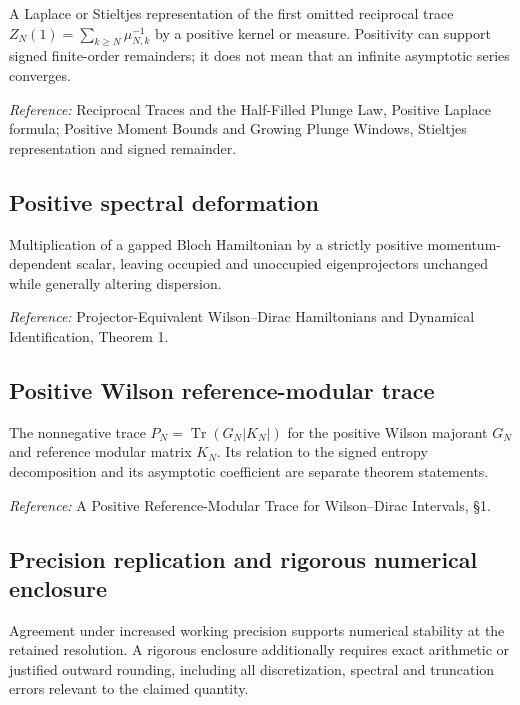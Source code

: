 \documentclass[
  10pt,
  a4paper,
]{article}
\begin{document}
A Laplace or Stieltjes representation of the first omitted reciprocal trace \(Z_N(1)=\sum_{k\ge N}\mu_{N,k}^{-1}\) by a positive kernel or measure. Positivity can support signed finite-order remainders; it does not mean that an infinite asymptotic series converges.

\nopagebreak[4]

\emph{Reference:} Reciprocal Traces and the Half-Filled Plunge Law, Positive Laplace formula; Positive Moment Bounds and Growing Plunge Windows, Stieltjes representation and signed remainder.

\subsection{Positive spectral deformation}\label{positive-spectral-deformation}

Multiplication of a gapped Bloch Hamiltonian by a strictly positive momentum-dependent scalar, leaving occupied and unoccupied eigenprojectors unchanged while generally altering dispersion.

\nopagebreak[4]

\emph{Reference:} Projector-Equivalent Wilson--Dirac Hamiltonians and Dynamical Identification, Theorem 1.

\subsection{Positive Wilson reference-modular trace}\label{positive-wilson-reference-modular-trace}

The nonnegative trace \(P_N=\operatorname{Tr}(G_N|K_N|)\) for the positive Wilson majorant \(G_N\) and reference modular matrix \(K_N\). Its relation to the signed entropy decomposition and its asymptotic coefficient are separate theorem statements.

\nopagebreak[4]

\emph{Reference:} A Positive Reference-Modular Trace for Wilson--Dirac Intervals, §1.

\subsection{Precision replication and rigorous numerical enclosure}\label{precision-replication-and-rigorous-numerical-enclosure}

Agreement under increased working precision supports numerical stability at the retained resolution. A rigorous enclosure additionally requires exact arithmetic or justified outward rounding, including all discretization, spectral and truncation errors relevant to the claimed quantity.
\end{document}
